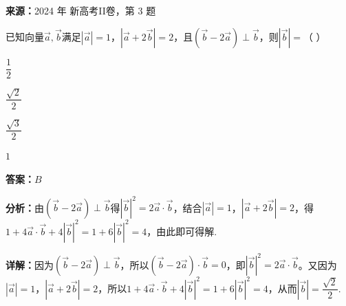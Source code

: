 \begin{question}[points=5]
\textbf{来源：}2024 年 新高考II卷，第 3 题\par
已知向量$\vec{a}, \vec{b}$满足$|\vec{a}|=1$，$|\vec{a}+2\vec{b}|=2$，且$(\vec{b}-2\vec{a}) \perp \vec{b}$，则$|\vec{b}|=$（ ）
\begin{choices}
  \item $\dfrac{1}{2}$
  \item $\dfrac{\sqrt{2}}{2}$
  \item $\dfrac{\sqrt{3}}{2}$
  \item $1$
\end{choices}
\begin{solution}
\textbf{答案：}$B$

\textbf{分析：}由$(\vec{b}-2\vec{a})\perp\vec{b}$得$|\vec{b}|^2=2\vec{a}\cdot\vec{b}$，结合$|\vec{a}|=1$，$|\vec{a}+2\vec{b}|=2$，得$1+4\vec{a}\cdot\vec{b}+4|\vec{b}|^2=1+6|\vec{b}|^2=4$，由此即可得解.

\textbf{详解：}因为$(\vec{b}-2\vec{a})\perp\vec{b}$，所以$(\vec{b}-2\vec{a})\cdot\vec{b}=0$，即$|\vec{b}|^2=2\vec{a}\cdot\vec{b}$。又因为$|\vec{a}|=1$，$|\vec{a}+2\vec{b}|=2$，所以$1+4\vec{a}\cdot\vec{b}+4|\vec{b}|^2=1+6|\vec{b}|^2=4$，从而$|\vec{b}|=\dfrac{\sqrt{2}}{2}$.
\end{solution}
\end{question}

